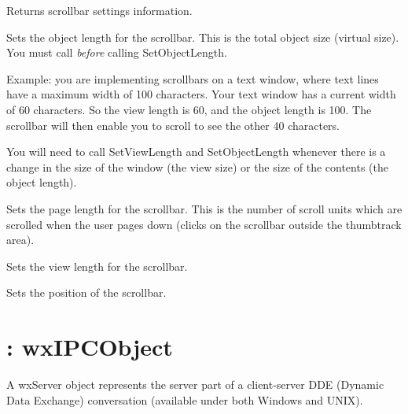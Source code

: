 Returns scrollbar settings information.

\label{wxscrollbarsetobjectlength}


Sets the object length for the scrollbar. This is the total object size (virtual size). You must
call  {\it before} calling SetObjectLength.

Example: you are implementing scrollbars on a text window, where text lines have a maximum width
of 100 characters. Your text window has a current width of 60 characters. So the view length is 60,
and the object length is 100. The scrollbar will then enable you to scroll to see the other 40 characters.

You will need to call SetViewLength and SetObjectLength whenever there
is a change in the size of the window (the view size) or the size of the
contents (the object length). 

\label{wxscrollbarsetpagelength}


Sets the page length for the scrollbar. This is the number of scroll units which are scrolled when the
user pages down (clicks on the scrollbar outside the thumbtrack area).

\label{wxscrollbarsetviewlength}


Sets the view length for the scrollbar.

\label{wxscrollbarsetvalue}


Sets the position of the scrollbar.

\section{: wxIPCObject}\label{wxserver}


A wxServer object represents the server part of a client-server DDE
(Dynamic Data Exchange) conversation (available under both Windows
and UNIX).

